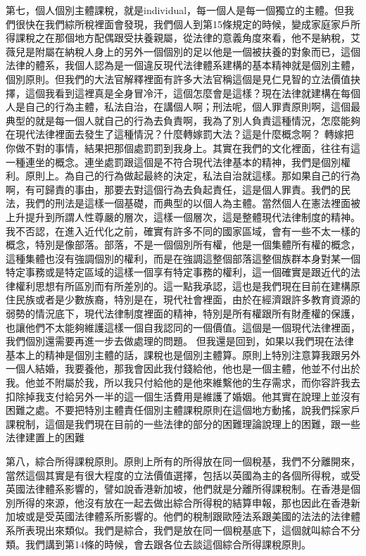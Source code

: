 \documentclass[]{ctexbook}
\begin{document}
第七，個人個別主體課稅，就是individual，每一個人是每一個獨立的主體。但我們很快在我們綜所稅裡面會發現，我們個人到第15條規定的時候，變成家庭家戶所得課稅之在那個地方配偶跟受扶養親屬，從法律的意義角度來看，他不是納稅，艾薇兒是附屬在納稅人身上的另外一個個別的足以他是一個被扶養的對象而已，這個法律的體系，我個人認為是一個違反現代法律體系建構的基本精神就是個別主體，個別原則。但我們的大法官解釋裡面有許多大法官稱這個是見仁見智的立法價值抉擇，這個我看到這裡真是全身冒冷汗，這個怎麼會是這樣？現在法律就建構在每個人是自己的行為主體，私法自治，在講個人啊；刑法呢，個人罪責原則啊，這個最典型的就是每一個人就自己的行為去負責啊，我為了別人負責這種情況，怎麼能夠在現代法律裡面去發生了這種情況？什麼轉嫁罰大法？這是什麼概念啊？ 轉嫁把你做不對的事情，結果把那個處罰罰到我身上。其實在我們的文化裡面，往往有這一種連坐的概念。連坐處罰跟這個是不符合現代法律基本的精神，我們是個別權利。原則上。為自己的行為做起最終的決定，私法自治就這樣。那如果自己的行為啊，有可歸責的事由，那要去對這個行為去負起責任，這是個人罪責。我們的民法，我們的刑法是這樣一個基礎，而典型的以個人為主體。當然個人在憲法裡面被上升提升到所謂人性尊嚴的層次，這樣一個層次，這是整體現代法律制度的精神。我不否認，在進入近代化之前，確實有許多不同的國家區域，會有一些不太一樣的概念，特別是像部落。部落，不是一個個別所有權，他是一個集體所有權的概念，這種集體也沒有強調個別的權利，而是在強調這整個部落這整個族群本身對某一個特定事務或是特定區域的這樣一個享有特定事務的權利，這一個確實是跟近代的法律權利思想有所區別而有所差別的。這一點我承認，這也是我們現在目前在建構原住民族或者是少數族裔，特別是在，現代社會裡面，由於在經濟跟許多教育資源的弱勢的情況底下，現代法律制度裡面的精神，特別是所有權跟所有財產權的保護，也讓他們不太能夠維護這樣一個自我認同的一個價值。這個是一個現代法律裡面，我們個別還需要再進一步去做處理的問題。
但我還是回到，如果以我們現在法律基本上的精神是個別主體的話，課稅也是個別主體算。原則上特別注意算我跟另外一個人結婚，我要養他，那我會因此我付錢給他，他也是一個主體，他並不付出於我。他並不附屬於我，所以我只付給他的是他來維繫他的生存需求，而你容許我去扣除掉我支付給另外一半的這一個生活費用是維護了婚姻。他其實在說理上並沒有困難之處。不要把特別主體責任個別主體課稅原則在這個地方動搖，說我們採家戶課稅制，這個是我們現在目前的一些法律的部分的困難理論說理上的困難，跟一些法律建置上的困難

第八，綜合所得課稅原則。原則上所有的所得放在同一個稅基，我們不分離開來，當然這個其實是有很大程度的立法價值選擇，包括以英國為主的各個所得稅，或受英國法律體系影響的，譬如說香港新加坡，他們就是分離所得課稅制。在香港是個別所得的來源，他沒有放在一起去做出綜合所得稅的結算申報，那也因此在香港新加坡或是受英國法律體系所影響的。他們的稅制跟歐陸法系跟美國的法法的法律體系所表現出來類似。我們是綜合，我們是放在同一個稅基底下，這個就叫綜合不分類。我們講到第14條的時候，會去跟各位去談這個綜合所得課稅原則。
\end{document}
